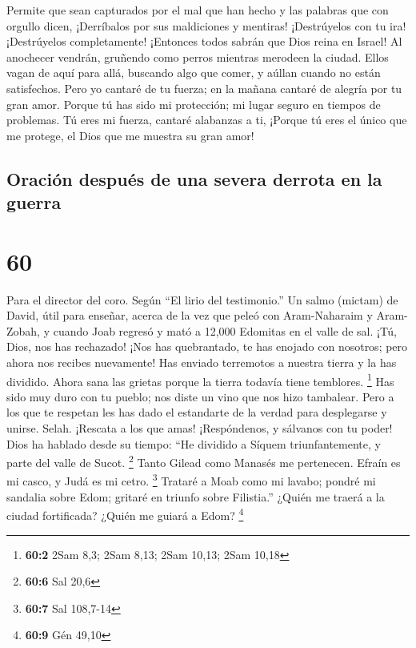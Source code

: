  Permite que sean capturados por el mal que han hecho y las
palabras que con orgullo dicen, ¡Derríbalos por sus maldiciones y
mentiras!  ¡Destrúyelos con tu ira! ¡Destrúyelos
completamente! ¡Entonces todos sabrán que Dios reina en Israel!
 Al anochecer vendrán, gruñendo como perros mientras
merodeen la ciudad.  Ellos vagan de aquí para allá,
buscando algo que comer, y aúllan cuando no están satisfechos.
 Pero yo cantaré de tu fuerza; en la mañana cantaré de
alegría por tu gran amor. Porque tú has sido mi protección; mi lugar
seguro en tiempos de problemas.  Tú eres mi fuerza, cantaré
alabanzas a ti, ¡Porque tú eres el único que me protege, el Dios que me
muestra su gran amor!

\hypertarget{oraciuxf3n-despuuxe9s-de-una-severa-derrota-en-la-guerra}{%
\subsection{Oración después de una severa derrota en la
guerra}\label{oraciuxf3n-despuuxe9s-de-una-severa-derrota-en-la-guerra}}

\hypertarget{section-59}{%
\section{60}\label{section-59}}

Para el director del coro. Según ``El lirio del testimonio.'' Un salmo
(mictam) de David, útil para enseñar, acerca de la vez que peleó con
Aram-Naharaim y Aram-Zobah, y cuando Joab regresó y mató a 12,000
Edomitas en el valle de sal.  ¡Tú, Dios, nos has rechazado!
¡Nos has quebrantado, te has enojado con nosotros; pero ahora nos
recibes nuevamente!  Has enviado terremotos a nuestra tierra
y la has dividido. Ahora sana las grietas porque la tierra todavía tiene
temblores. \footnote{\textbf{60:2} 2Sam 8,3; 2Sam 8,13; 2Sam 10,13; 2Sam
  10,18}  Has sido muy duro con tu pueblo; nos diste un vino
que nos hizo tambalear.  Pero a los que te respetan les has
dado el estandarte de la verdad para desplegarse y unirse. Selah.
¡Rescata a los que amas!  ¡Respóndenos, y sálvanos con tu
poder!  Dios ha hablado desde su tiempo: ``He dividido a
Síquem triunfantemente, y parte del valle de Sucot. \footnote{\textbf{60:6}
  Sal 20,6}  Tanto Gilead como Manasés me pertenecen. Efraín
es mi casco, y Judá es mi cetro. \footnote{\textbf{60:7} Sal 108,7-14}
 Trataré a Moab como mi lavabo; pondré mi sandalia sobre
Edom; gritaré en triunfo sobre Filistia.''  ¿Quién me traerá
a la ciudad fortificada? ¿Quién me guiará a Edom? \footnote{\textbf{60:9}
  Gén 49,10}


